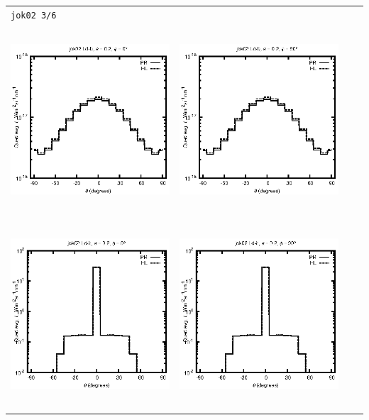 \begin{tabular}{c c c c}
\multicolumn{4}{l}{\texttt{jok02 3/6}} \\
\includegraphics[height=7cm]{../eps/jok02_Ld_b_fwd.eps} &
\includegraphics[height=7cm]{../eps/jok02_Ld_b_cross.eps} \\
\includegraphics[height=7cm]{../eps/jok02_Ld_it_fwd.eps} &
\includegraphics[height=7cm]{../eps/jok02_Ld_it_cross.eps} \\

\end{tabular}
